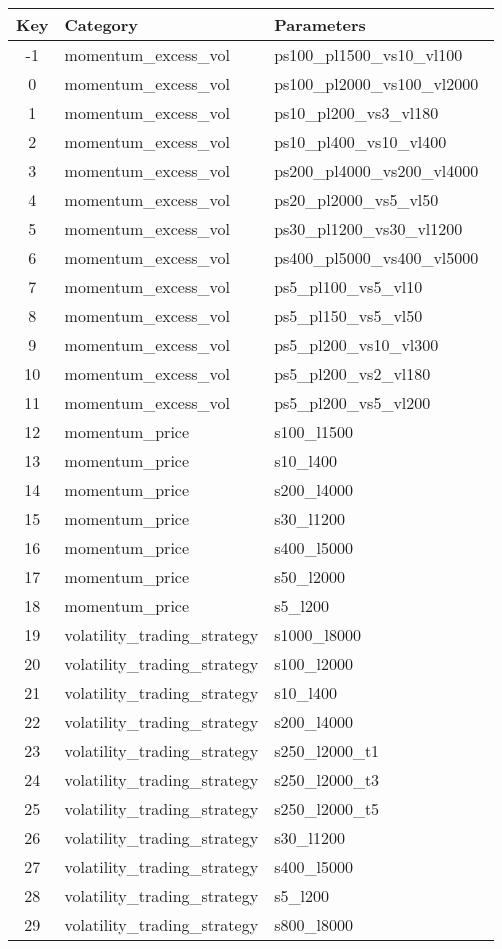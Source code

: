 \begin{tabular}{c|ll}

Key & Category & Parameters \\
\hline
-1 & momentum\_excess\_vol&ps100\_pl1500\_vs10\_vl100\ \\
0 & momentum\_excess\_vol&ps100\_pl2000\_vs100\_vl2000\ \\
1 & momentum\_excess\_vol&ps10\_pl200\_vs3\_vl180\ \\
2 & momentum\_excess\_vol&ps10\_pl400\_vs10\_vl400\ \\
3 & momentum\_excess\_vol&ps200\_pl4000\_vs200\_vl4000\ \\
4 & momentum\_excess\_vol&ps20\_pl2000\_vs5\_vl50\ \\
5 & momentum\_excess\_vol&ps30\_pl1200\_vs30\_vl1200\ \\
6 & momentum\_excess\_vol&ps400\_pl5000\_vs400\_vl5000\ \\
7 & momentum\_excess\_vol&ps5\_pl100\_vs5\_vl10\ \\
8 & momentum\_excess\_vol&ps5\_pl150\_vs5\_vl50\ \\
9 & momentum\_excess\_vol&ps5\_pl200\_vs10\_vl300\ \\
10 & momentum\_excess\_vol&ps5\_pl200\_vs2\_vl180\ \\
11 & momentum\_excess\_vol&ps5\_pl200\_vs5\_vl200\ \\
12 & momentum\_price&s100\_l1500\ \\
13 & momentum\_price&s10\_l400\ \\
14 & momentum\_price&s200\_l4000\ \\
15 & momentum\_price&s30\_l1200\ \\
16 & momentum\_price&s400\_l5000\ \\
17 & momentum\_price&s50\_l2000\ \\
18 & momentum\_price&s5\_l200\ \\
19 & volatility\_trading\_strategy&s1000\_l8000\ \\
20 & volatility\_trading\_strategy&s100\_l2000\ \\
21 & volatility\_trading\_strategy&s10\_l400\ \\
22 & volatility\_trading\_strategy&s200\_l4000\ \\
23 & volatility\_trading\_strategy&s250\_l2000\_t1\ \\
24 & volatility\_trading\_strategy&s250\_l2000\_t3\ \\
25 & volatility\_trading\_strategy&s250\_l2000\_t5\ \\
26 & volatility\_trading\_strategy&s30\_l1200\ \\
27 & volatility\_trading\_strategy&s400\_l5000\ \\
28 & volatility\_trading\_strategy&s5\_l200\ \\
29 & volatility\_trading\_strategy&s800\_l8000\ \\


\end{tabular}